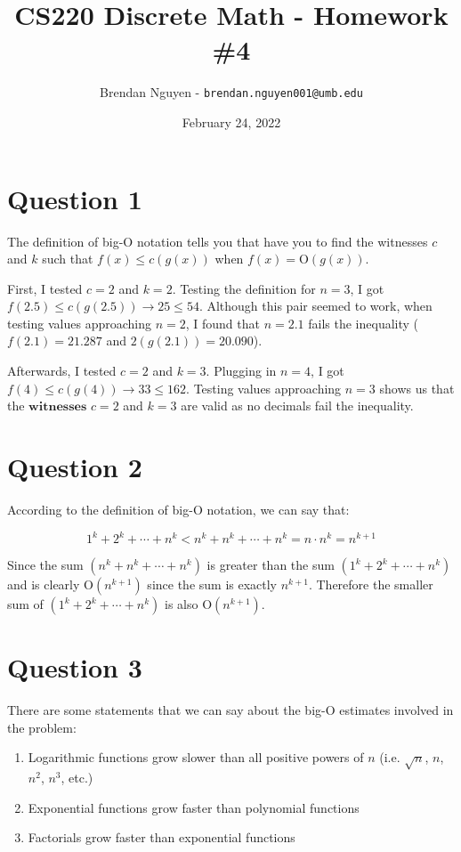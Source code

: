 \documentclass[letterpaper, 12pt]{article}
\title{CS220 Discrete Math - Homework \#4}
\author{Brendan Nguyen - \texttt{brendan.nguyen001@umb.edu}}
\date{February 24, 2022}
\begin{document}
\maketitle

\section*{Question 1}
The definition of big-$\mathrm{O}$ notation tells you that have you to find the witnesses $c$ and $k$ such that $f(x) \leq c(g(x))$ when $f(x) = \mathrm{O}(g(x))$.

First, I tested $c=2$ and $k=2$. Testing the definition for $n=3$, I got $f(2.5) \leq c(g(2.5)) \to 25 \leq 54$. Although this pair seemed to work, when testing values approaching $n=2$, I found that $n=2.1$ fails the inequality ($f(2.1)=21.287$ and $2(g(2.1))=20.090$).

Afterwards, I tested $c=2$ and $k=3$. Plugging in $n=4$, I got $f(4) \leq c(g(4)) \to 33 \leq 162$. Testing values approaching $n=3$ shows us that the $\textbf{witnesses}$ $c=2$ and $k=3$ are valid as no decimals fail the inequality.

\section*{Question 2}
According to the definition of big-$\mathrm{O}$ notation, we can say that:

\[1^k + 2^k + \cdots + n^k < n^k + n^k + \cdots + n^k = n \cdot n^k = n^{k+1}\]

Since the sum $(n^k + n^k + \cdots + n^k)$ is greater than the sum $(1^k + 2^k + \cdots + n^k)$ and is clearly $\mathrm{O}(n^{k+1})$ since the sum is exactly $n^{k+1}$. Therefore the smaller sum of $(1^k + 2^k + \cdots + n^k)$ is also $\mathrm{O}(n^{k+1})$.

\section*{Question 3}
There are some statements that we can say about the big-$\mathrm{O}$ estimates involved in the problem:
\begin{enumerate}[label=\arabic*.]
    \item Logarithmic functions grow slower than all positive powers of $n$ (i.e. $\sqrt{n}$, $n$, $n^2$, $n^3$, etc.)
    \item Exponential functions grow faster than polynomial functions
    \item Factorials grow faster than exponential functions
\end{enumerate}
\end{document}

